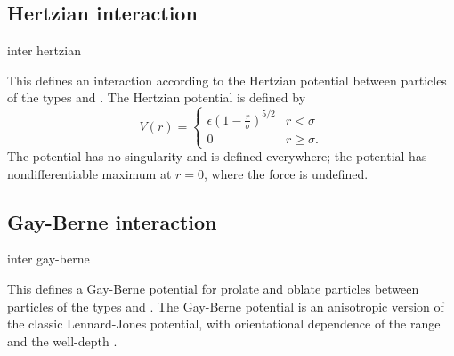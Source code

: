 \subsection{Hertzian interaction}

\begin{essyntax}
  inter  
  hertzian \var{\sigma} \var{\epsilon}
  \begin{features}
  \end{features}
\end{essyntax}
This defines an interaction according to the Hertzian potential
between particles of the types  and . The
Hertzian potential is defined by
\begin{equation}
  V(r)=
  \begin{cases} \epsilon\left(1-\frac{r}{\sigma}\right)^{5/2} & r < \sigma\\
    0 & r \ge \sigma.
  \end{cases}
\end{equation}
The potential has no singularity and is defined everywhere; the
potential has nondifferentiable maximum at $r=0$, where the force is
undefined.

\subsection{Gay-Berne interaction}

\begin{essyntax}
  inter   gay-berne
    
    \var{\mu} \var{\nu}
  \begin{features}
  \end{features}
\end{essyntax}
This defines a Gay-Berne potential for prolate and oblate particles
between particles of the types  and . The
Gay-Berne potential is an anisotropic version of the classic
Lennard-Jones potential, with orientational dependence of the range
 and the well-depth .

